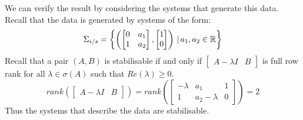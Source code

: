 We can verify the result by considering the systems that generate this data. Recall that the data is generated by systems of the form:
\[ \Sigma_{i/s} = \left\{ \left( \begin{bmatrix} 0&a_1 \\ 1&a_2 \end{bmatrix}, \begin{bmatrix} 1 \\ 0 \end{bmatrix} \right) \, | \, a_1, a_2 \in \mathbb{R} \right\} \]
Recall that a pair $(A,B)$ is stabilisable if and only if $\begin{bmatrix} A - \lambda I & B \end{bmatrix}$ is full row rank for all $\lambda \in \sigma(A)$ such that $Re(\lambda) \geq 0$. 
\[ rank \left( \begin{bmatrix} A - \lambda I & B \end{bmatrix} \right) = rank \left( \begin{bmatrix} -\lambda & a_1 & 1 \\ 1 & a_2 - \lambda & 0 \end{bmatrix} \right) = 2 \]
Thus the systems that describe the data are stabilisable.